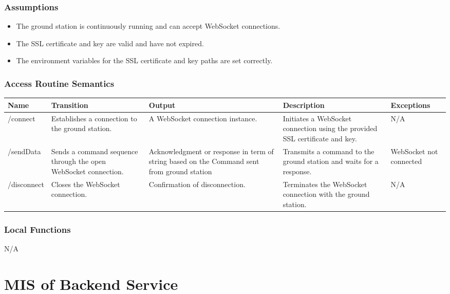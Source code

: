\documentclass[12pt, titlepage]{article}
\begin{document}
\subsubsection{Assumptions}

\begin{itemize}
    \item The ground station is continuously running and can accept WebSocket connections.
    \item The SSL certificate and key are valid and have not expired.
    \item The environment variables for the SSL certificate and key paths are set correctly.
\end{itemize}

\subsubsection{Access Routine Semantics}

\begin{center}
\begin{tabular}{|p{3.7cm} |p{3cm} | p{3.6cm} |p{4cm} |p{2.3cm}|}
\hline
\textbf{Name} & \textbf{Transition} & \textbf{Output} & \textbf{Description} & \textbf{Exceptions} \\
\hline
/connect & Establishes a connection to the ground station. & A WebSocket connection instance. & Initiates a WebSocket connection using the provided SSL certificate and key. & N/A \\
\hline
/sendData & Sends a command sequence through the open WebSocket connection. & Acknowledgment or response in term of string based on the Command sent from ground station & Transmits a command to the ground station and waits for a response. & WebSocket not connected \\
\hline
/disconnect & Closes the WebSocket connection. & Confirmation of disconnection. & Terminates the WebSocket connection with the ground station. & N/A \\
\hline
\end{tabular}
\end{center}

\subsubsection{Local Functions}

N/A

\section{MIS of Backend Service} \label{Module} 
\end{document}

